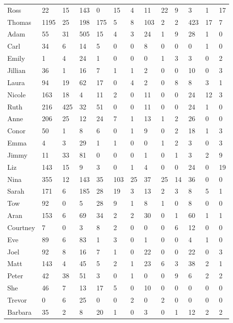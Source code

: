 \begin{table}[!h]
\begin{tabular}{l|lll|lll|lll|lll}
Ross & 22 & 15 & 143 & 0 & 15 & 4 & 11 & 22 & 9 & 3 & 1 & 17 \\
Thomas & 1195 & 25 & 198 & 175 & 5 & 8 & 103 & 2 & 2 & 423 & 17 & 7 \\
Adam & 55 & 31 & 505 & 15 & 4 & 3 & 24 & 1 & 9 & 28 & 1 & 0 \\
Carl & 34 & 6 & 14 & 5 & 0 & 0 & 8 & 0 & 0 & 0 & 1 & 0 \\
Emily & 1 & 4 & 24 & 1 & 0 & 0 & 0 & 1 & 3 & 3 & 0 & 2 \\
Jillian & 36 & 1 & 16 & 7 & 1 & 1 & 2 & 0 & 0 & 10 & 0 & 3 \\
Laura & 94 & 19 & 62 & 17 & 0 & 4 & 2 & 0 & 8 & 8 & 3 & 1 \\
Nicole & 163 & 18 & 4 & 11 & 2 & 0 & 11 & 0 & 0 & 24 & 12 & 3 \\
Ruth & 216 & 425 & 32 & 51 & 0 & 0 & 11 & 0 & 0 & 24 & 1 & 0 \\
Anne & 206 & 25 & 12 & 24 & 7 & 1 & 13 & 1 & 2 & 26 & 0 & 0 \\
Conor & 50 & 1 & 8 & 6 & 0 & 1 & 9 & 0 & 2 & 18 & 1 & 3 \\
Emma & 4 & 3 & 29 & 1 & 1 & 0 & 0 & 1 & 2 & 3 & 0 & 3 \\
Jimmy & 11 & 33 & 81 & 0 & 0 & 0 & 1 & 0 & 1 & 3 & 2 & 9 \\
Liz & 143 & 15 & 9 & 3 & 0 & 1 & 4 & 0 & 0 & 24 & 0 & 19 \\
Nina & 355 & 12 & 143 & 35 & 103 & 25 & 37 & 25 & 14 & 36 & 0 & 0 \\
Sarah & 171 & 6 & 185 & 28 & 19 & 3 & 13 & 2 & 3 & 8 & 5 & 1 \\
Tow & 92 & 0 & 5 & 28 & 9 & 1 & 8 & 1 & 0 & 8 & 0 & 0 \\
Aran & 153 & 6 & 69 & 34 & 2 & 2 & 30 & 0 & 1 & 60 & 1 & 1 \\
Courtney & 7 & 0 & 3 & 8 & 2 & 0 & 0 & 0 & 6 & 12 & 0 & 0 \\
Eve & 89 & 6 & 83 & 1 & 3 & 0 & 1 & 0 & 0 & 4 & 1 & 0 \\
Joel & 92 & 8 & 16 & 7 & 1 & 0 & 22 & 0 & 0 & 22 & 0 & 3 \\
Matt & 143 & 4 & 45 & 5 & 2 & 1 & 23 & 6 & 3 & 38 & 2 & 1 \\
Peter & 42 & 38 & 51 & 3 & 0 & 1 & 0 & 0 & 9 & 6 & 2 & 2 \\
She & 46 & 7 & 13 & 17 & 5 & 0 & 10 & 0 & 0 & 0 & 0 & 0 \\
Trevor & 0 & 6 & 25 & 0 & 0 & 2 & 0 & 2 & 0 & 0 & 0 & 0 \\
Barbara & 35 & 2 & 8 & 20 & 1 & 0 & 3 & 0 & 1 & 12 & 2 & 2 \\

\end{tabular}
\end{table}

